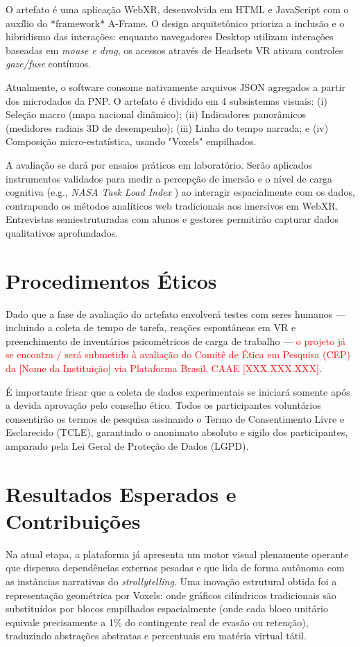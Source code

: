 \documentclass[12pt]{article}
\begin{document}
O artefato é uma aplicação WebXR, desenvolvida em HTML e JavaScript com o auxílio do *framework* A-Frame. O design arquitetônico prioriza a inclusão e o hibridismo das interações: enquanto navegadores Desktop utilizam interações baseadas em \textit{mouse e drag}, os acessos através de Headsets VR ativam controles \textit{gaze/fuse} contínuos.

Atualmente, o software consome nativamente arquivos JSON agregados a partir dos microdados da PNP. O artefato é dividido em 4 subsistemas visuais: (i) Seleção macro (mapa nacional dinâmico); (ii) Indicadores panorâmicos (medidores radiais 3D de desempenho); (iii) Linha do tempo narrada; e (iv) Composição micro-estatística, usando "Voxels" empilhados.

A avaliação se dará por ensaios práticos em laboratório. Serão aplicados instrumentos validados para medir a percepção de imersão e o nível de carga cognitiva (e.g., \textit{NASA Task Load Index} \cite{hart1988nasatlx}) ao interagir espacialmente com os dados, contrapondo os métodos analíticos web tradicionais aos imersivos em WebXR. Entrevistas semiestruturadas com alunos e gestores permitirão capturar dados qualitativos aprofundados.

\section{Procedimentos Éticos}

Dado que a fase de avaliação do artefato envolverá testes com seres humanos — incluindo a coleta de tempo de tarefa, reações espontâneas em VR e preenchimento de inventários psicométricos de carga de trabalho — \textcolor{red}{o projeto já se encontra / será submetido à avaliação do Comitê de Ética em Pesquisa (CEP) da [Nome da Instituição] via Plataforma Brasil, CAAE [XXX.XXX.XXX]}. 

É importante frisar que a coleta de dados experimentais se iniciará somente após a devida aprovação pelo conselho ético. Todos os participantes voluntários consentirão os termos de pesquisa assinando o Termo de Consentimento Livre e Esclarecido (TCLE), garantindo o anonimato absoluto e sigilo dos participantes, amparado pela Lei Geral de Proteção de Dados (LGPD).

\section{Resultados Esperados e Contribuições}

Na atual etapa, a plataforma já apresenta um motor visual plenamente operante que dispensa dependências externas pesadas e que lida de forma autônoma com as instâncias narrativas do \textit{strollytelling}. Uma inovação estrutural obtida foi a representação geométrica por Voxels: onde gráficos cilíndricos tradicionais são substituídos por blocos empilhados espacialmente (onde cada bloco unitário equivale precisamente a 1\% do contingente real de evasão ou retenção), traduzindo abstrações abstratas e percentuais em matéria virtual tátil.
\end{document}
